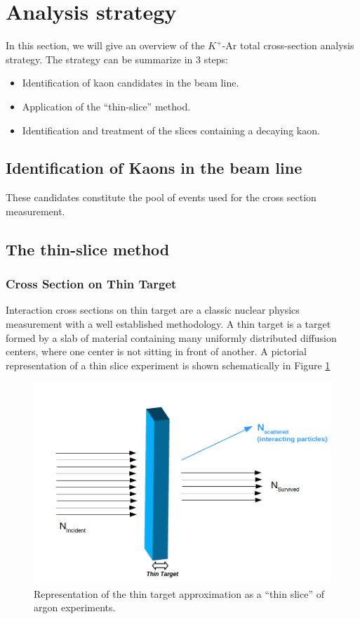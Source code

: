 \section{Analysis strategy}\label{sec:kaonAnalysis} 
 
In this section, we will give an overview of the $K^{+}$-Ar total cross-section analysis strategy. 
The strategy can be summarize in 3 steps:
\begin{itemize}
\item[1.] Identification of kaon candidates in the beam line.
\item[2.] Application of the ``thin-slice'' method.
\item[3.] Identification and treatment of the slices containing a decaying kaon.
\end{itemize}

\subsection{Identification of Kaons in the beam line}

These candidates constitute the pool of events used for the cross section measurement.

\label{sec:BeamlineKStrategy}
\subsection{The thin-slice method}
\label{sec:KXSStrategy}
\subsubsection{Cross Section on Thin Target}\label{sec:thinTargetXS}
Interaction cross sections on thin target are a classic nuclear physics measurement with a well established methodology. A thin target is a target formed by a slab of material containing many uniformly distributed diffusion centers, where  one center is not sitting in front of another.
A pictorial representation of a thin slice experiment is shown schematically in Figure \ref{fig:thinslice}

\begin{figure}[htb]
\centering
\includegraphics[scale=0.25]{./images/ThinTarget.png}
\caption{Representation of the thin target approximation as a ``thin slice'' of argon experiments.}
\label{fig:thinslice}
\end{figure}

